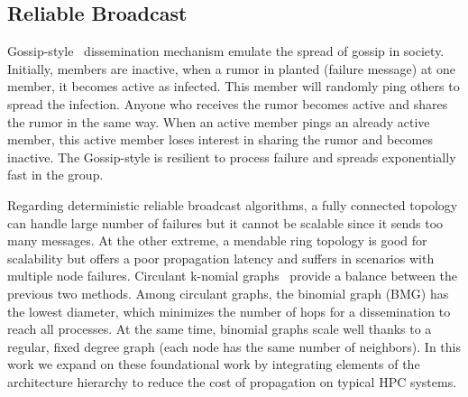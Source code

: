 \documentclass[sigconf]{acmart}
\begin{document}
\subsection{Reliable Broadcast}
Gossip-style~\cite{infection-style,Abhinandan02} dissemination mechanism emulate the spread of gossip in society. Initially, members are inactive, when a rumor in planted (failure message) at one member, it becomes active as infected. This member will randomly ping others to spread the infection. Anyone who receives the rumor becomes active and shares the rumor in the same way. When an active member pings an already active member, this active member loses interest in sharing the rumor and becomes inactive. The Gossip-style is resilient to process failure and spreads exponentially fast in the group. 

Regarding deterministic reliable broadcast algorithms, a fully connected topology can handle large number of failures but it cannot be scalable since it sends too many messages. At the other extreme, a mendable ring topology is good for scalability
but offers a poor propagation latency and suffers in scenarios with multiple node failures.
Circulant k-nomial graphs~\cite{Angskun07, Pava11} provide a balance between the previous two methods.
Among circulant graphs, the binomial graph (BMG) has the lowest diameter, which minimizes the number of hops for a dissemination to reach all
processes. At the same time, binomial graphs scale well thanks to a regular, fixed degree graph (each node has the same number of neighbors). In this work
we expand on these foundational work by integrating elements of the
architecture hierarchy to reduce the cost of propagation on typical HPC systems.

%
\end{document}
